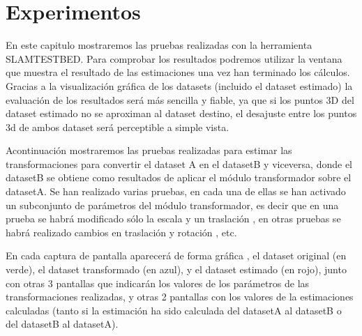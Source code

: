 \chapter{Experimentos} \label{cap:experimentos}
En este capitulo mostraremos las pruebas realizadas con la herramienta SLAMTESTBED.
Para comprobar los resultados podremos utilizar la ventana que muestra el resultado de las estimaciones una vez han terminado los cálculos. Gracias a la visualización gráfica de los datasets (incluido el dataset estimado) la evaluación de los resultados será más sencilla y fiable, ya que si los puntos 3D del dataset estimado no se aproximan al dataset destino, el desajuste entre los puntos 3d de ambos dataset será perceptible a simple vista.


Acontinuación mostraremos las pruebas realizadas para estimar las transformaciones para convertir el dataset A en el datasetB y viceversa, donde el datasetB se obtiene como resultados de aplicar el módulo transformador sobre el datasetA.
Se han realizado varias pruebas, en cada una de ellas se han activado un subconjunto de parámetros del módulo transformador, es decir que en una prueba se habrá modificado sólo la escala y un traslación , en otras pruebas se habrá realizado cambios en traslación y rotación , etc.

En cada captura de pantalla aparecerá de forma gráfica , el dataset original (en verde), el dataset transformado (en azul), y el dataset estimado (en rojo), junto con otras 3 pantallas que indicarán los valores de los parámetros de las transformaciones realizadas, y otras 2 pantallas con los valores de la estimaciones calculadas (tanto si la estimación ha sido calculada del datasetA al datasetB o del datasetB al datasetA).


